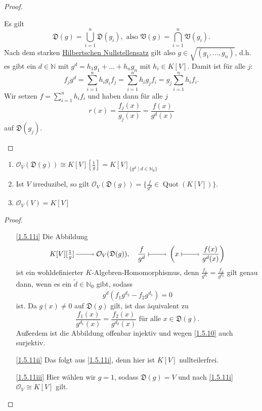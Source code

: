\documentclass[a4paper,12pt,index=toc]{scrbook}
\theoremstyle{keinenummern} %
\def\V{\mathfrak{V}}
\def\O{\mathcal{O}}
\newcommand{\D}{\mathfrak{D}}
\newcommand{\Quot}{\operatorname{Quot}}
\renewcommand{\dotsc}{\ensuremath{\!...}}
\newcommand{\schlange}[1]{\widetilde{#1}}
\newcommand{\set}[1]{\ensuremath{\mathbb{#1}}}
\newcommand{\N}{\set{N}}
\begin{document}
\begin{proof}
\begin{prooflist}
    Es gilt \begin{equation*}\D(g)=\bigcup_{i=1}^n \D(g_i),\text{ also }\V(g)=\bigcap_{i=1}^n\V(g_i).\end{equation*} Nach dem starken \hyperref[HNS]{Hilbertschen Nullstellensatz}
    gilt also $g\in\sqrt{(g_1,\dotsc,g_n)}$, d.h. es gibt ein $d\in\N$ mit $g^d=h_1g_1+\dotso+h_ng_n$ mit
    $h_i\in K[V]$. Damit ist für alle $j$:
    \begin{equation*} f_jg^d = \sum_{i=1}^nh_ig_if_j = \sum_{i=1}^n h_ig_jf_i = g_j\sum_{i=1}^nh_if_i. \end{equation*}
    Wir setzen $f=\displaystyle\sum_{i=1}^nh_if_i$ und haben dann für alle $j$ \begin{equation*}r(x)=\frac{f_j(x)}{g_j(x)}=\frac{f(x)}{g^d(x)}\end{equation*}
    auf $\D(g_j)$.
  \end{prooflist}
\end{proof}

\begin{kor}\label{1.5.11}
  \begin{enumerate}
  \item{} $\O_V(\D(g))\cong K[V][\frac1g] = K[V]_{\{g^d\mid d\in\N_0\}}$
  \item{} Ist $V$ irreduzibel, so gilt $\O_V(\D(g))=\{\frac{f}{g^d}\in\Quot(K[V])\}$.
  \item{} $\O_V(V)=K[V]$
  \end{enumerate}
\end{kor}
\begin{proof}
  \begin{enumerate}
  \item[\ref{1.5.11i}] Die Abbildung
    \begin{equation*}K[V][\textstyle\frac1g]\ra\O_V(\D(g)),\quad \displaystyle\frac{f}{g^d}\mapsto\left(x\mapsto\frac{f(x)}{g^d(x)}\right) \end{equation*}
    ist ein wohldefinierter $K$-Algebren-Homomorphismus, denn $\frac{f_1}{g^{d_1}}=\frac{f_2}{g^{d_2}}$ gilt genau dann, wenn es
    ein $\schlange{d}\in\N_0$ gibt, sodass \begin{equation*}g^{\schlange{d}}(f_1g^{d_2}-f_2g^{d_1})=0\end{equation*} ist. Da $g(x)\neq0$ auf $\D(g)$ gilt, ist das
    äquivalent zu \begin{equation*}\frac{f_1(x)}{g^{d_1}(x)}=\frac{f_2(x)}{g^{d_2}(x)}\text{ für alle }x\in \D(g).\end{equation*} Außerdem ist die Abbildung
    offenbar injektiv und wegen \cref{1.5.10} auch surjektiv.
  \item[\ref{1.5.11ii}] Das folgt aus \ref{1.5.11i}, denn hier ist $K[V]$ nullteilerfrei.
  \item[\ref{1.5.11iii}] Hier wählen wir $g=1$, sodass $\D(g)=V$ und nach \ref{1.5.11i} $\O_V\cong K[V]$ gilt.
  \end{enumerate}
\end{proof}
\end{document}
